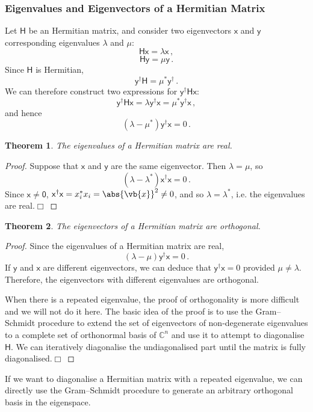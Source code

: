 \documentclass{article}
\theoremstyle{plain}\theoremheaderfont{\normalfont\itshape}\theorembodyfont{\rmfamily}\theoremseparator{.}\newtheorem*{rem}{Remark}\newtheorem*{ex}{Example}\newtheorem*{proof}{Proof}\newtheorem*{altp}{Alternative proof}
\theoremstyle{plain}\theoremheaderfont{\normalfont\bfseries}\theorembodyfont{\rmfamily}\theoremseparator{.}\newtheorem{thm}{Theorem}[section]\newtheorem{lem}[thm]{Lemma}\newtheorem{prop}[thm]{Proposition}\newtheorem*{cor}{Corollary}\newtheorem{defn}[thm]{Definition}\newtheorem{clm}[thm]{Claim}\newtheorem{clminproof}{Claim}
\theoremstyle{break}\theoremheaderfont{\normalfont\itshape}\theorembodyfont{\rmfamily}\theoremseparator{.\medskip}\newtheorem*{proofskip}{Proof}\newtheorem*{exs}{Examples}\newtheorem*{rems}{Remarks}
\theoremstyle{break}\theoremheaderfont{\normalfont\bfseries}\theorembodyfont{\rmfamily}\theoremseparator{.\medskip}\newtheorem{lemskip}[thm]{Lemma}\newtheorem{defnskip}[thm]{Definition}\newtheorem{propskip}[thm]{Proposition}\newtheorem{thmskip}[thm]{Theorem}
\numberwithin{equation}{section}
\newcommand{\qed}{\hfill\ensuremath{\Box}}
\begin{document}
	\subsubsection{Eigenvalues and Eigenvectors of a Hermitian Matrix}
	Let \(\mathsf{H}\) be an Hermitian matrix, and consider two eigenvectors \(\mathsf{x}\) and \(\mathsf{y}\) corresponding eigenvalues \(\lambda\) and \(\mu\):
	\[\mathsf{Hx}=\lambda\mathsf{x}\,,\]
	\[\mathsf{Hy}=\mu\mathsf{y}\,.\]
	Since \(\mathsf{H}\) is Hermitian,
	\[\mathsf{y^\dagger H}=\mu^*\mathsf{y}^\dagger\,.\]
	We can therefore construct two expressions for \(\mathsf{y^\dagger Hx}\):
	\[\mathsf{y^\dagger Hx}=\lambda\mathsf{y^\dagger x}=\mu^*\mathsf{y^\dagger x}\,,\]
	and hence
	\[(\lambda-\mu^*)\mathsf{y^\dagger x}=0\,.\]
	
	\begin{thm}
		The eigenvalues of a Hermitian matrix are real.
	\end{thm}
	\begin{proof}
		Suppose that \(\mathsf{x}\) and \(\mathsf{y}\) are the same eigenvector. Then \(\lambda=\mu\), so
		\[(\lambda-\lambda^*)\mathsf{x^\dagger x}=0\,.\]
		Since \(\mathsf{x\ne 0}\), \(\mathsf{x^\dagger x}=x_i^*x_i=\abs{\vb{x}}^2\ne 0\), and so \(\lambda=\lambda^*\), i.e. the eigenvalues are real.\qed
	\end{proof}
	\begin{thm}
		The eigenvectors of a Hermitian matrix are orthogonal.
	\end{thm}
	\begin{proof} Since the eigenvalues of a Hermitian matrix are real,
		\[(\lambda-\mu)\mathsf{y^\dagger x}=0\,.\]
		If \(\mathsf{y}\) and \(\mathsf{x}\) are different eigenvectors, we can deduce that \(\mathsf{y^\dagger x}=0\) provided \(\mu\ne\lambda\). Therefore, the eigenvectors with different eigenvalues are orthogonal.
		
		When there is a repeated eigenvalue, the proof of orthogonality is more difficult and we will not do it here. The basic idea of the proof is to use the Gram--Schmidt procedure to extend the set of eigenvectors of non-degenerate eigenvalues to a complete set of orthonormal basis of \(\mathbb{C}^n\) and use it to attempt to diagonalise \(\mathsf{H}\). We can iteratively diagonalise the undiagonalised part until the matrix is fully diagonalised.\qed
	\end{proof}
	If we want to diagonalise a Hermitian matrix with a repeated eigenvalue, we can directly use the Gram--Schmidt procedure to generate an arbitrary orthogonal basis in the eigenspace.
\end{document}
